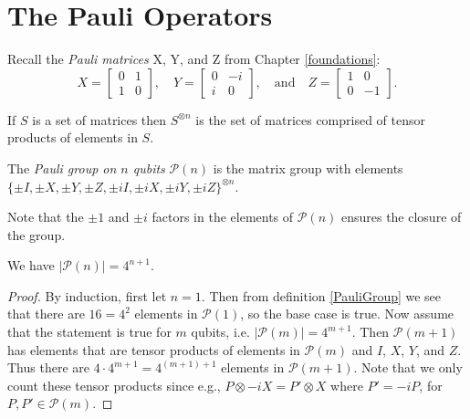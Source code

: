 \documentclass[12pt]{dalthesis}
\begin{document}
\section{The Pauli Operators}

Recall the \emph{Pauli matrices} X, Y, and Z from Chapter \ref{foundations}:
  \[
  X= \begin{bmatrix}
    0 & 1 \\
    1 & 0
  \end{bmatrix}, \quad
  Y = \begin{bmatrix}
  0 & -i \\
  i & 0
  \end{bmatrix}, \quad \mbox{and} \quad
  Z = \begin{bmatrix}
  1 & 0 \\
  0 & -1
  \end{bmatrix}.
  \]

If $S$ is a set of matrices then $S^{\otimes n}$ is the set of matrices comprised of tensor products of elements in $S$.

\begin{definition}
\label{PauliGroup}
The \emph{Pauli group on $n$ qubits} $\mathcal{P}(n)$ is the matrix group with elements $\{ \pm I, \pm X, \pm Y, \pm Z, \pm iI, \pm iX, \pm iY, \pm iZ \}^{\otimes n}$.
\end{definition}

Note that the $\pm 1$ and $\pm i$ factors in the elements of $\mathcal{P}(n)$ ensures the closure of the group.


\begin{proposition}
\label{PauliCardinality}
We have $|\mathcal{P}(n)|=4^{n+1}$.
\end{proposition}

\begin{proof}
By induction, first let $n=1$. Then from definition \ref{PauliGroup} we see that there are $16 = 4^2$ elements in $\mathcal{P}(1)$, so the base case is true. Now assume that the statement is true for $m$ qubits, i.e. $|\mathcal{P}(m)| = 4^{m+1}$. Then $\mathcal{P}(m+1)$ has elements that are tensor products of elements in $\mathcal{P}(m)$ and $I$, $X$, $Y$, and $Z$. Thus there are $4 \cdot 4^{m+1} = 4^{(m+1)+1}$ elements in $\mathcal{P}(m+1)$. Note that we only count these tensor products since e.g., $P \otimes -iX = P' \otimes X$ where $P' = -iP$, for $P, P' \in \mathcal{P}(m)$.
\end{proof}
\end{document}
